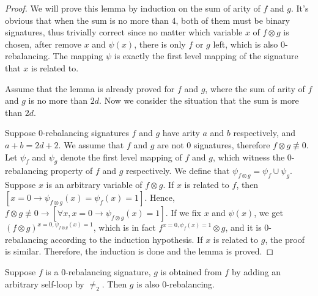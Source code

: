 \documentclass[a4paper,UKenglish,cleveref, autoref, thm-restate]{lipics-v2021}
\newcommand{\ba}[1][0]{{{#1}-rebalancing}}
\begin{document}
\begin{proof}
We will prove this lemma by induction on the sum of arity of $f$ and $g$. It's obvious that when the sum is no more than 4, both of them must be binary signatures, thus trivially correct since no matter which variable $x$ of $f\otimes g$ is chosen, after remove $x$ and $\psi(x)$, there is only $f$ or $g$ left, which is also \ba[0]. The mapping $\psi$ is exactly the first level mapping of the signature that $x$ is related to.

Assume that the lemma is already proved for $f$ and $g$, where the sum of arity of $f$ and $g$ is no more than $2d$. Now we consider the situation that the sum is more than $2d$.

Suppose \ba[0] signatures $f$ and $g$ have arity $a$ and $b$ respectively, and $a+b=2d+2$. We assume that $f$ and $g$ are not 0 signatures, therefore $f\otimes g\not\equiv 0$.
Let $\psi_f$ and $\psi_g$ denote the first level mapping of $f$ and $g$, which witness the \ba[0] property of $f$ and $g$ respectively. 
We define that $\psi_{f\otimes g} = \psi_f \cup \psi_g$. 
Suppose $x$ is an arbitrary variable of $f \otimes g$. If $x$ is related to $f$, then $[x =0 \to \psi_{f\otimes g}(x)= \psi_f(x) =1]$. Hence, $f \otimes g \not\equiv 0 \to  [\forall x, x =0 \to \psi_{f\otimes g}(x) =1]$. If we fix $x$ and $\psi(x)$, we get $(f \otimes g)^{x=0,\psi_{f\otimes g}(x) =1} $, which is in fact $f^{x=0,\psi_{f}(x) =1} \otimes g$, and it is \ba[0] according to the induction hypothesis. If $x$ is related to $g$, the proof is similar. Therefore, the induction is done and the lemma is proved. 
\end{proof}

\begin{lemma} \label{lem:ba-jumper-closed}
Suppose $f$ is a \ba[0] signature, $g$ is obtained from $f$ by adding an arbitrary self-loop by $\neq_2$. Then $g$ is also \ba[0].
\end{lemma}
\end{document}
